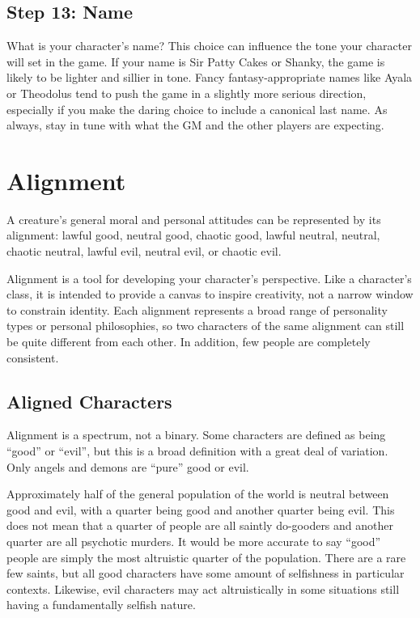   \subsection{Step 13: Name}
    What is your character's name?
    This choice can influence the tone your character will set in the game.
    If your name is Sir Patty Cakes or Shanky, the game is likely to be lighter and sillier in tone.
    Fancy fantasy-appropriate names like Ayala or Theodolus tend to push the game in a slightly more serious direction, especially if you make the daring choice to include a canonical last name.
    As always, stay in tune with what the GM and the other players are expecting.

\section{Alignment}\label{Alignment}
  A creature's general moral and personal attitudes can be represented by its alignment: lawful good, neutral good, chaotic good, lawful neutral, neutral, chaotic neutral, lawful evil, neutral evil, or chaotic evil.

  Alignment is a tool for developing your character's perspective.
  Like a character's class, it is intended to provide a canvas to inspire creativity, not a narrow window to constrain identity.
  Each alignment represents a broad range of personality types or personal philosophies, so two characters of the same alignment can still be quite different from each other.
  In addition, few people are completely consistent.

  \subsection{Aligned Characters}
    Alignment is a spectrum, not a binary.
    Some characters are defined as being ``good'' or ``evil'', but this is a broad definition with a great deal of variation.
    Only angels and demons are ``pure'' good or evil.

    Approximately half of the general population of the world is neutral between good and evil, with a quarter being good and another quarter being evil.
    This does not mean that a quarter of people are all saintly do-gooders and another quarter are all psychotic murders.
    It would be more accurate to say ``good'' people are simply the most altruistic quarter of the population.
    There are a rare few saints, but all good characters have some amount of selfishness in particular contexts.
    Likewise, evil characters may act altruistically in some situations still having a fundamentally selfish nature.

